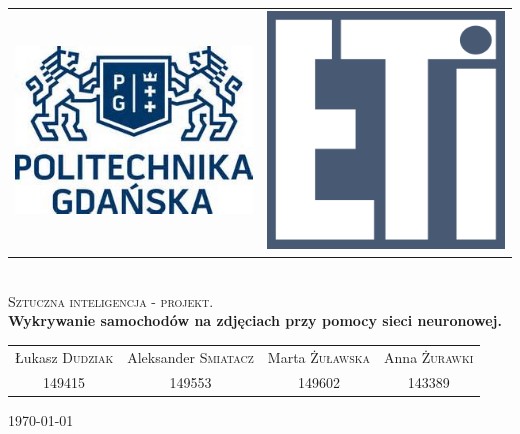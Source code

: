 \documentclass{article}
\begin{document}
\begin{titlepage}
\begin{center}

\begin{tabular}{c c}
\includegraphics[scale=0.5]{pg.jpg} & \includegraphics[scale=0.3]{eti.png}
\end{tabular}
\\[1.5cm]

\textsc{\LARGE Sztuczna inteligencja - projekt.}\\[1.0cm]

{ \huge \bfseries Wykrywanie samochodów na zdjęciach przy pomocy sieci neuronowej. \\[1.5cm] }

\noindent
\begin{tabular}[c]{c c c c}
Łukasz \textsc{Dudziak} & Aleksander \textsc{Smiatacz} & Marta \textsc{Żuławska} & Anna \textsc{Żurawki} \\
149415 & 149553 & 149602 & 143389 \\
\end{tabular}

\vfill
{\large \today}

\end{center}
\end{titlepage}
\end{document}
